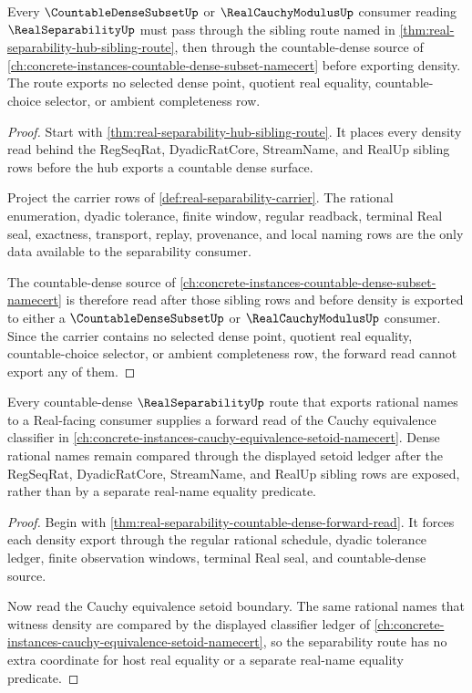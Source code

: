 \begin{theorem}
\label{thm:real-separability-countable-dense-forward-read}
Every $\CountableDenseSubsetUp$ or $\RealCauchyModulusUp$ consumer reading $\RealSeparabilityUp$ must pass through the sibling route named in \autoref{thm:real-separability-hub-sibling-route}, then through the countable-dense source of \autoref{ch:concrete-instances-countable-dense-subset-namecert} before exporting density. The route exports no selected dense point, quotient real equality, countable-choice selector, or ambient completeness row.
\end{theorem}
\begin{proof}
Start with \autoref{thm:real-separability-hub-sibling-route}. It places every density read behind the RegSeqRat, DyadicRatCore, StreamName, and RealUp sibling rows before the hub exports a countable dense surface.

Project the carrier rows of \autoref{def:real-separability-carrier}. The rational enumeration, dyadic tolerance, finite window, regular readback, terminal Real seal, exactness, transport, replay, provenance, and local naming rows are the only data available to the separability consumer.

The countable-dense source of \autoref{ch:concrete-instances-countable-dense-subset-namecert} is therefore read after those sibling rows and before density is exported to either a $\CountableDenseSubsetUp$ or $\RealCauchyModulusUp$ consumer. Since the carrier contains no selected dense point, quotient real equality, countable-choice selector, or ambient completeness row, the forward read cannot export any of them.
\end{proof}

\begin{theorem}
\label{thm:real-separability-cauchy-setoid-forward-orphan-link}
Every countable-dense $\RealSeparabilityUp$ route that exports rational names to a Real-facing consumer supplies a forward read of the Cauchy equivalence classifier in \autoref{ch:concrete-instances-cauchy-equivalence-setoid-namecert}. Dense rational names remain compared through the displayed setoid ledger after the RegSeqRat, DyadicRatCore, StreamName, and RealUp sibling rows are exposed, rather than by a separate real-name equality predicate.
\end{theorem}
\begin{proof}
Begin with \autoref{thm:real-separability-countable-dense-forward-read}. It forces each density export through the regular rational schedule, dyadic tolerance ledger, finite observation windows, terminal Real seal, and countable-dense source.

Now read the Cauchy equivalence setoid boundary. The same rational names that witness density are compared by the displayed classifier ledger of \autoref{ch:concrete-instances-cauchy-equivalence-setoid-namecert}, so the separability route has no extra coordinate for host real equality or a separate real-name equality predicate.
\end{proof}
